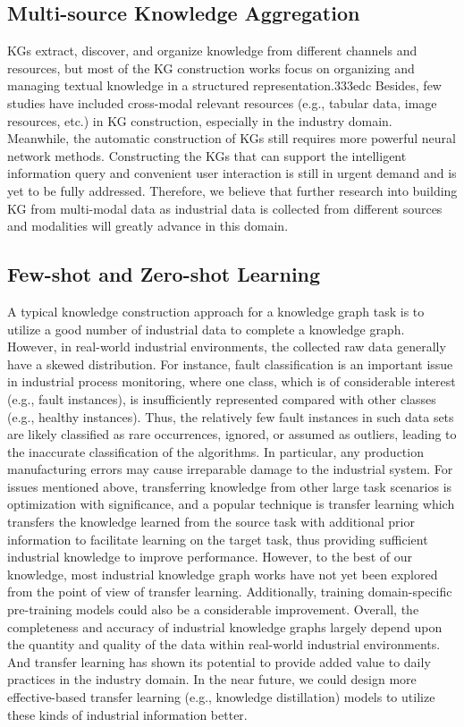 \documentclass[11pt]{article}
\begin{document}
\subsection{Multi-source Knowledge Aggregation}
\par{KGs extract, discover, and organize knowledge from different channels and resources, but most of the KG construction works focus on organizing and managing textual knowledge in a structured representation.333edc
Besides, few studies have included cross-modal relevant resources (e.g., tabular data, image resources, etc.) in KG construction, especially in the industry domain.
Meanwhile, the automatic construction of KGs still requires more powerful neural network methods.
Constructing the KGs that can support the intelligent information query and convenient user interaction is still in urgent demand and is yet to be fully addressed.
Therefore, we believe that further research into building KG from multi-modal data as industrial data is collected from different sources and modalities will greatly advance in this domain.}

\subsection{Few-shot and Zero-shot Learning}
\par{A typical knowledge construction approach for a knowledge graph task is to utilize a good number of industrial data to complete a knowledge graph.
However, in real-world industrial environments, the collected raw data generally have a skewed distribution.
For instance, fault classification is an important issue in industrial process monitoring, where one class, which is of considerable interest (e.g., fault instances), is insufficiently represented compared with other classes (e.g., healthy instances).
Thus, the relatively few fault instances in such data sets are likely classified as rare occurrences, ignored, or assumed as outliers, leading to the inaccurate classification of the algorithms.
In particular, any production manufacturing errors may cause irreparable damage to the industrial system.
For issues mentioned above, transferring knowledge from other large task scenarios is optimization with significance, and a popular technique is transfer learning which transfers the knowledge learned from the source task with additional prior information to facilitate learning on the target task, thus providing sufficient industrial knowledge to improve performance.
However, to the best of our knowledge, most industrial knowledge graph works have not yet been explored from the point of view of transfer learning.
Additionally, training domain-specific pre-training models could also be a considerable improvement.
Overall, the completeness and accuracy of industrial knowledge graphs largely depend upon the quantity and quality of the data within real-world industrial environments.
And transfer learning has shown its potential to provide added value to daily practices in the industry domain.
In the near future, we could design more effective-based transfer learning (e.g., knowledge distillation) models to utilize these kinds of industrial information better.}
\end{document}
